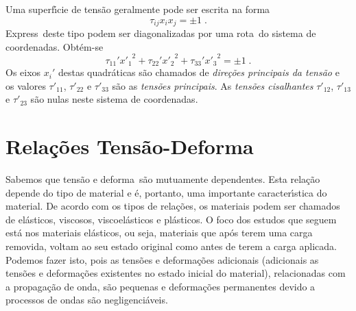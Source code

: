 Uma superf\'{\i}cie de tens\~ao geralmente pode ser escrita na
forma
\begin{equation}
\tau_{ij} x_i x_j = \pm 1 \;.
\end{equation}
Express\oes\ deste tipo podem ser diagonalizadas por uma rota\cao\ do
sistema de coordenadas. Obt\'em-se
\begin{equation}
\tau_{11}' {x'_1}^2 + \tau_{22}' {x'_2}^2 +
\tau_{33}' {x'_3}^2 = \pm 1 \;.
\end{equation}
Os eixos $x_i'$ destas quadr\'aticas s\~ao chamados de {\it
dire\c{c}\~oes principais da tens\~ao} e os valores
$\tau'_{11}$, $\tau'_{22}$ e $\tau'_{33}$ s\~ao as {\it
tens\~oes principais}. As {\it tens\~oes cisalhantes} $\tau'_{12}$,
$\tau'_{13}$ e $\tau'_{23}$ s\~ao nulas neste sistema
de coordenadas.



\section{Rela\c{c}\~oes Tens\~ao-Deforma\cao}

Sabemos que tens\~ao e deforma\cao\ s\~ao mutuamente
dependentes. Esta rela\c{c}\~ao depende do tipo de material e \'e,
portanto, uma importante caracter\'{\i}stica do material. De
acordo com os tipos de rela\c{c}\~oes, os materiais podem ser
chamados de el\'asticos, viscosos, viscoel\'asticos e pl\'asticos.
O foco dos estudos que seguem est\'a nos materiais el\'asticos, ou
seja, materiais que ap\'os terem uma carga removida, voltam ao seu
estado original como antes de terem a carga aplicada. Podemos
fazer isto, pois as tens\~oes e deforma\c{c}\~oes adicionais
(adicionais as tens\~oes e deforma\c{c}\~oes existentes no
estado inicial do material), relacionadas com a propaga\c{c}\~ao
de onda, s\~ao pequenas e deforma\c{c}\~oes permanentes
devido a processos de ondas s\~ao negligenci\'aveis.


